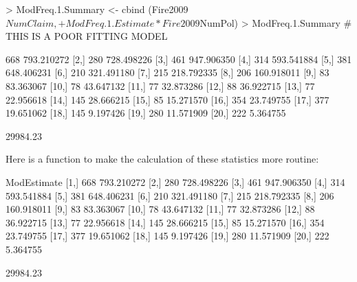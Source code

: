 \documentclass[12pt,letterpaper]{article}
\begin{document}
\begin{center}
\begin{Schunk}
\begin{Sinput}
> ModFreq.1.Summary <- cbind (Fire2009$NumClaim,
+    ModFreq.1.Estimate*Fire2009$NumPol)
>    ModFreq.1.Summary  #  THIS IS A POOR FITTING MODEL
\end{Sinput}
\begin{Soutput}
      [,1]       [,2]
 [1,]  668 793.210272
 [2,]  280 728.498226
 [3,]  461 947.906350
 [4,]  314 593.541884
 [5,]  381 648.406231
 [6,]  210 321.491180
 [7,]  215 218.792335
 [8,]  206 160.918011
 [9,]   83  83.363067
[10,]   78  43.647132
[11,]   77  32.873286
[12,]   88  36.922715
[13,]   77  22.956618
[14,]  145  28.666215
[15,]   85  15.271570
[16,]  354  23.749755
[17,]  377  19.651062
[18,]  145   9.197426
[19,]  280  11.571909
[20,]  222   5.364755
\end{Soutput}
\begin{Soutput}
[1] 29984.23
\end{Soutput}
\end{Schunk}
\end{center}

Here is a function to make the calculation of these statistics more routine:

\begin{Schunk}
\begin{Soutput}
          ModEstimate
 [1,] 668  793.210272
 [2,] 280  728.498226
 [3,] 461  947.906350
 [4,] 314  593.541884
 [5,] 381  648.406231
 [6,] 210  321.491180
 [7,] 215  218.792335
 [8,] 206  160.918011
 [9,]  83   83.363067
[10,]  78   43.647132
[11,]  77   32.873286
[12,]  88   36.922715
[13,]  77   22.956618
[14,] 145   28.666215
[15,]  85   15.271570
[16,] 354   23.749755
[17,] 377   19.651062
[18,] 145    9.197426
[19,] 280   11.571909
[20,] 222    5.364755
\end{Soutput}
\begin{Soutput}
[1] 29984.23
\end{Soutput}
\end{Schunk}
\end{document}
